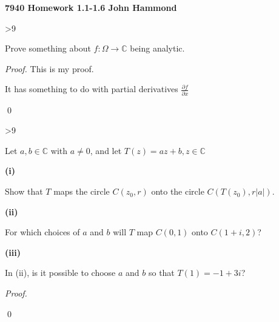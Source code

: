 \documentclass[11pt]{article}
\def\C{{\mathbb{C}}}
\newcommand{\pd}[2]{\frac{\partial #1}{\partial #2}}
\newenvironment{problem}[1]%
  {\vspace{\baselineskip}%
   \ifnum #1>9 \else \hspace{.78ex} \fi {\large \bf#1.$\;$}%
   \begin{lrbox}{\probinput}%
   \begin{minipage}[t]{.9175\textwidth}}%
  {\end{minipage}%
   \end{lrbox}%
   \usebox{\probinput}}
\newenvironment{subprob}[1]%
  {\vspace{.5\baselineskip}%
   {\bf #1)$\;$}%
   \begin{lrbox}{\subinput}%
   \begin{minipage}[t]{.965\textwidth}}%
  {\end{minipage}%
   \end{lrbox}%
   \usebox{\subinput}}
\begin{document}
{\large \bf 7940 Homework 1.1-1.6 \hfill John Hammond}
\vspace{\baselineskip}

\begin{problem}{1} 
Prove something about $f : \Omega \to \C$ being analytic.

\emph{Proof.}  This is my proof.  

It has something to do with partial derivatives $\pd{f}{x}$

\qed
\end {problem}

\begin{problem}{15}
Let $a, b \in \C$ with $a \not=0$, and let $T(z) = az + b, z \in \C$

\begin{subprob}{(i}
Show that $T$ maps the circle $C(z_0, r) $ onto the circle $C(T(z_0), r|a|)$.
\end{subprob}
\begin{subprob}{(ii}
For which choices of $a$ and $b$ will $T$ map $C(0,1)$ onto $C(1 + i, 2)$?
\end{subprob}
\begin{subprob}{(iii}
In (ii), is it possible to choose $a$ and $b$ so that $T(1) = -1 + 3i$?
\end{subprob}
\emph{Proof.}

\qed
\end{problem}
\end{document}
